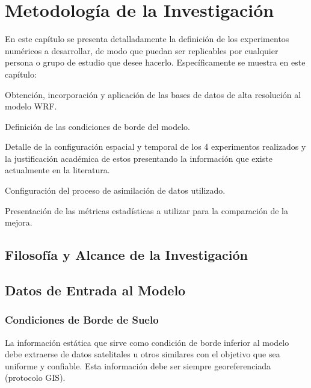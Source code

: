 \chapter{Metodología de la Investigación}
En este capítulo se presenta detalladamente la definición de los experimentos numéricos a desarrollar, de modo que puedan ser replicables por cualquier persona o grupo de estudio que desee hacerlo. Específicamente se muestra en este capítulo: 
\begin{itemize*}
	\item Obtención, incorporación y aplicación de las bases de datos de alta resolución al modelo WRF.
	\item Definición de las condiciones de borde del modelo.
	\item Detalle de la configuración espacial y temporal de los 4 experimentos realizados y la justificación académica de estos presentando la información que existe actualmente en la literatura.
	\item Configuración del proceso de asimilación de datos utilizado.
	\item Presentación de las métricas estadísticas a utilizar para la comparación de la mejora.
\end{itemize*}
\section{Filosofía y Alcance de la Investigación}

\section{Datos de Entrada al Modelo}
\subsection{Condiciones de Borde de Suelo}
La información estática que sirve como condición de borde inferior al modelo debe extraerse de datos satelitales u otros similares con el objetivo que sea uniforme y confiable. Esta información debe ser siempre georeferenciada (protocolo GIS).

